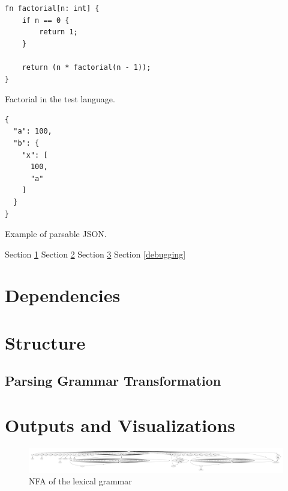 \begin{listing}[H]
\begin{verbatim}
fn factorial[n: int] {
    if n == 0 {
        return 1;
    } 

    return (n * factorial(n - 1));
}
\end{verbatim}
\caption{Factorial in the test language.}
\label{lst:factorial_example}
\end{listing}

\begin{listing}[H]
\begin{verbatim}
{
  "a": 100,
  "b": {
    "x": [
      100,
      "a"
    ]
  }
}
\end{verbatim}
\caption{Example of parsable JSON.}
\hrulefill
\label{lst:json_example}
\end{listing}

Section \ref{dependancies}
\newline \newline
Section \ref{structure}
\newline \newline
Section \ref{outputs_and_visualizations}
\newline \newline
Section \ref{debugging}

\section{Dependencies} \label{dependancies}
\section{Structure} \label{structure}
\subsection{Parsing Grammar Transformation} \label{parsing_grammar_transformation}
\section{Outputs and Visualizations} \label{outputs_and_visualizations}

\begin{figure}[t]
\includegraphics[width=\linewidth]{images/nfa.png}
\caption{NFA of the lexical grammar}
\label{fig:nfa}
\end{figure}

